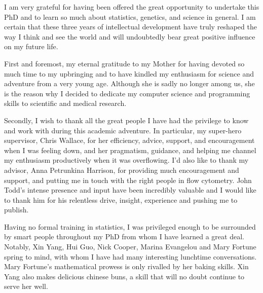 
\begin{acknowledgements}      

 I am very grateful for having been offered the great opportunity to undertake this PhD and to learn so much about statistics,
 genetics, and science in general.
 I am certain that these three years of intellectual development have truly reshaped the way I think and see the world
 and will undoubtedly bear great positive influence on my future life.

 First and foremost, my eternal gratitude to my Mother for having devoted so much time to my upbringing and to have kindled my enthusiasm for science
 and adventure from a very young age.
 Although she is sadly no longer among us,
 she is the reason why I decided to dedicate my computer science and programming skills to scientific and medical research.

 Secondly, I wish to thank all the great people I have had the privilege to know and work with during this academic adventure.
 In particular, my super-hero supervisor, Chris Wallace, for her efficiency, advice, support, and encouragement when I was feeling down,
 and her pragmatism, guidance,
 and helping me channel my enthusiasm productively when it was overflowing.
 I'd also like to thank my advisor, Anna Petrunkina Harrison, for providing much encouragement and support,
 and putting me in touch with the right people in flow cytometry.
 John Todd's intense presence and input have been incredibly valuable and I would like to thank him for his relentless drive,
 insight, experience and pushing me to publish.

 Having no formal training in statistics,
 I was privileged enough to be surrounded by smart people throughout my PhD from whom I have learned a great deal.
 Notably, Xin Yang, Hui Guo, Nick Cooper, Marina Evangelou and Mary Fortune spring to mind,
 with whom I have had many interesting lunchtime conversations.
 Mary Fortune's  mathematical prowess is only rivalled by her baking skills.
 Xin Yang also makes delicious chinese buns, a skill that will no doubt continue to serve her well.


\end{acknowledgements}
